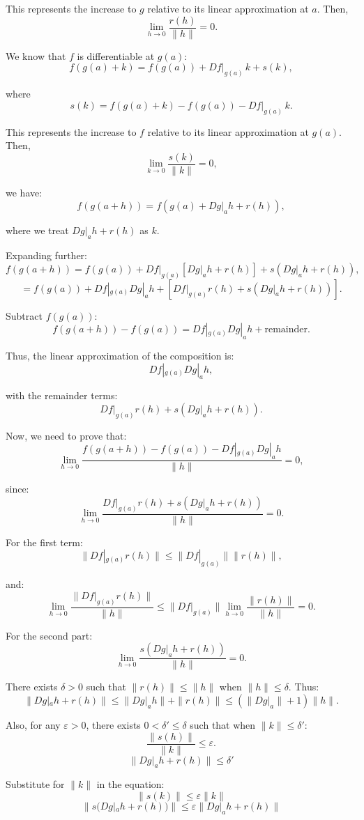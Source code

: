 \documentclass[11pt]{article}
\begin{document}
This represents the increase to \( g \) relative to its linear approximation at \( a \). Then,
\[
\lim_{h \to 0} \frac{r(h)}{\|h\|} = 0.
\]

We know that \( f \) is differentiable at \( g(a) \):
\[
f(g(a) + k) = f(g(a)) + Df|_{g(a)} \, k + s(k),
\]

where
\[
s(k) = f(g(a) + k) - f(g(a)) - Df|_{g(a)} \, k.
\]

This represents the increase to \( f \) relative to its linear approximation at \( g(a) \). Then,
\[
\lim_{k \to 0} \frac{s(k)}{\|k\|} = 0,
\]

we have:
\[
f(g(a+h)) = f(g(a) + Dg|_a h + r(h)),
\]

where we treat \( Dg|_a h + r(h) \) as \( k \).

Expanding further:
\[
f(g(a+h)) = f(g(a)) + Df|_{g(a)} [Dg|_a h + r(h)] + s(Dg|_a h + r(h)),
\]
\[
= f(g(a)) + Df|_{g(a)} Dg|_a h + [Df|_{g(a)} r(h) + s(Dg|_a h + r(h))].
\]

Subtract \( f(g(a)) \):
\[
f(g(a+h)) - f(g(a)) = Df|_{g(a)} Dg|_a h + \text{remainder}.
\]

Thus, the linear approximation of the composition is:
\[
Df|_{g(a)} Dg|_a h,
\]

with the remainder terms:
\[
Df|_{g(a)} r(h) + s(Dg|_a h + r(h)).
\]

Now, we need to prove that:
\[
\lim_{h \to 0} \frac{f(g(a+h)) - f(g(a)) - Df|_{g(a)} Dg|_a h}{\|h\|} = 0,
\]

since:
\[
\lim_{h \to 0} \frac{Df|_{g(a)} r(h) + s(Dg|_a h + r(h))}{\|h\|} = 0.
\]

For the first term:
\[
\|Df|_{g(a)} r(h)\| \leq \|Df|_{g(a)}\| \|r(h)\|,
\]

and:
\[
\lim_{h \to 0} \frac{\|Df|_{g(a)} r(h)\|}{\|h\|} \leq \|Df|_{g(a)}\| \lim_{h \to 0} \frac{\|r(h)\|}{\|h\|} = 0.
\]

For the second part:
\[
\lim_{h \to 0} \frac{s(Dg|_a h + r(h))}{\|h\|} = 0.
\]

There exists \( \delta > 0 \) such that \( \|r(h)\| \leq \|h\| \) when \( \|h\| \leq \delta \). Thus:
\[
\|Dg|_a h + r(h)\| \leq \|Dg|_a h\| + \|r(h)\| \leq (\|Dg|_a\| + 1) \|h\|.
\]

Also, for any \( \varepsilon > 0 \), there exists \( 0 < \delta' \leq \delta \) such that when \( \|k\| \leq \delta' \):
\[
\frac{\|s(h)\|}{\|k\|} \leq \varepsilon.
\]
\[
\| Dg|_{a} h + r(h) \| \leq \delta'
\]

Substitute for \( \| k \| \) in the equation:
\[
\| s(k) \| \leq \varepsilon \| k \|
\]
\[
\| s(Dg|_{a} h + r(h)) \| \leq \varepsilon \| Dg|_{a} h + r(h) \|
\]
\end{document}
